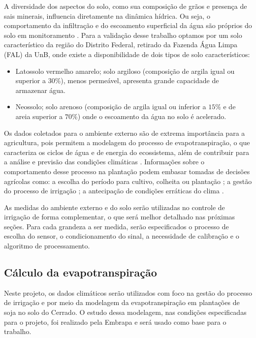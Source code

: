	A diversidade dos aspectos do solo, como sua composição de grãos e presença de sais minerais, influencia diretamente na dinâmica hídrica. Ou seja, o comportamento da infiltração e do escoamento superficial da água são próprios do solo em monitoramento \cite{bib_sen_01_ian}. Para a validação desse trabalho optamos por um solo característico da região do Distrito Federal, retirado da Fazenda Água Limpa (FAL) da UnB, onde existe a disponibilidade de dois tipos de solo característicos:

	\begin{itemize}
		\item Latossolo vermelho amarelo; solo argiloso (composição de argila igual ou superior a $30\%$), menos permeável, apresenta grande capacidade de armazenar água.
		\item Neossolo; solo arenoso (composição de argila igual ou inferior a $15\%$ e de areia superior a $70\%$) onde o escoamento da água no solo é acelerado.    
    \end{itemize}	

    Os dados coletados para o ambiente externo são de extrema importância para a agricultura, pois permitem a modelagem do processo de evapotranspiração, o que caracteriza os ciclos de água e de energia do ecossistema, além de contribuir para a análise e previsão das condições climáticas \cite{bib_sen_04_victor}. Informações sobre o comportamento desse processo na plantação podem embasar tomadas de decisões agrícolas como: a escolha do período para cultivo, colheita ou plantação \cite{bib_sen_05_victor}; a gestão do processo de irrigação \cite{bib_sen_06_victor}; a antecipação de condições erráticas do clima \cite{bib_sen_07_victor}.

	As medidas do ambiente externo e do solo serão utilizadas no controle de irrigação de forma complementar, o que será melhor detalhado nas próximas seções. Para cada grandeza a ser medida, serão especificados o processo de escolha do sensor, o condicionamento do sinal, a necessidade de calibração e o algoritmo de processamento. 

	\subsection{Cálculo da evapotranspiração}

		Neste projeto, os dados climáticos serão utilizados com foco na gestão do processo de irrigação e por meio da modelagem da evapotranspiração em plantações de soja no solo do Cerrado. O estudo dessa modelagem, nas condições especificadas para o projeto, foi realizado pela Embrapa \cite{bib_sen_01_victor} e será usado como base para o trabalho. 

